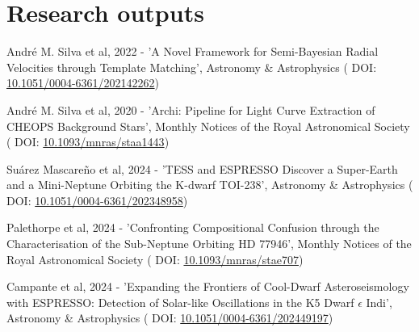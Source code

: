 \section{Research outputs}


\vspace*{0.2cm}

  André M. Silva et al, 2022 - 'A Novel Framework for Semi-{{Bayesian}} Radial Velocities through Template Matching', Astronomy \& Astrophysics (\textcolor{MarkerColour!80!black}{\scriptsize\faLink} DOI: \href{http://dx.doi.org/10.1051/0004-6361/202142262}{10.1051/0004-6361/202142262})

\vspace*{0.3cm}

  André M. Silva et al, 2020 - 'Archi: Pipeline for Light Curve Extraction of {{CHEOPS}} Background Stars', Monthly Notices of the Royal Astronomical Society (\textcolor{MarkerColour!80!black}{\scriptsize\faLink} DOI: \href{http://dx.doi.org/10.1093/mnras/staa1443}{10.1093/mnras/staa1443})

\vspace*{0.3cm}

\vspace*{0.2cm}


\vspace*{0.2cm}

  Su{\'a}rez Mascare{\~n}o et al, 2024 - '{{TESS}} and {{ESPRESSO}} Discover a Super-{{Earth}} and a Mini-{{Neptune}} Orbiting the {{K-dwarf TOI-238}}', Astronomy \& Astrophysics ( \textcolor{MarkerColour!80!black}{\scriptsize\faLink} DOI: \href{http://dx.doi.org/10.1051/0004-6361/202348958}{10.1051/0004-6361/202348958})

\vspace*{0.3cm}

  Palethorpe et al, 2024 - 'Confronting Compositional Confusion through the Characterisation of the Sub-{{Neptune}} Orbiting {{HD}} 77946', Monthly Notices of the Royal Astronomical Society ( \textcolor{MarkerColour!80!black}{\scriptsize\faLink} DOI: \href{http://dx.doi.org/10.1093/mnras/stae707}{10.1093/mnras/stae707})

\vspace*{0.3cm}

  Campante et al, 2024 - 'Expanding the Frontiers of Cool-Dwarf Asteroseismology with {{ESPRESSO}}: {{Detection}} of Solar-like Oscillations in the {{K5}} Dwarf {\emph{{$\epsilon$}}} {{Indi}}', Astronomy \& Astrophysics ( \textcolor{MarkerColour!80!black}{\scriptsize\faLink} DOI: \href{http://dx.doi.org/10.1051/0004-6361/202449197}{10.1051/0004-6361/202449197})

